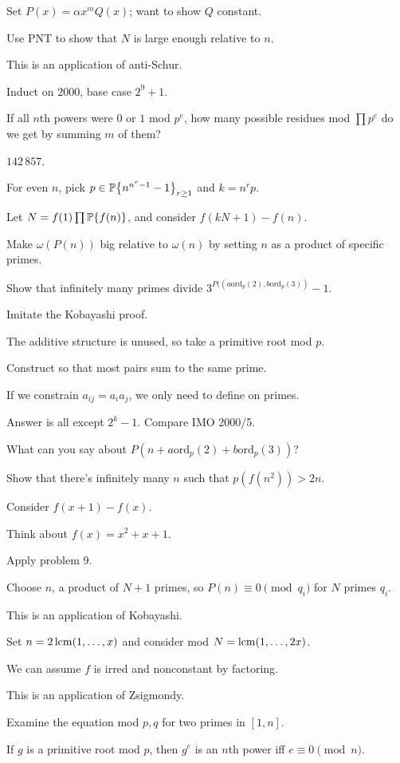 \documentclass[11pt,paper=letter]{scrartcl}
\newcommand{\seq}[1]{\left\{#1\right\}}
\newcommand{\primeseq}[1]{\PP\!\seq{#1}}
\begin{document}
\begin{enumthin}
\item \label{h:18a} Set $P(x) = \alpha x^m Q(x)$; want to show $Q$ constant.
\item \label{h:19c} Use PNT to show that $N$ is large enough relative to $n$.
\item \label{h:1} This is an application of anti-Schur.
\item \label{h:7} Induct on $2000$, base case $2^9 + 1$.
\item \label{h:19a} If all $n$th powers were $0$ or $1$ mod $p^e$, how many possible residues mod $\prod p^e$ do we get by summing $m$ of them?
\item \label{h:13} $142\,857$.
\item \label{h:10} For even $n$, pick $p \in \primeseq{n^{n^r - 1} - 1}_{r \ge 1}$ and $k = n^rp$.
\item \label{h:8} Let $N = f(1) \prod \primeseq{f(n)}$, and consider $f(kN + 1) - f(n)$.
\item \label{h:18b} Make $\omega(P(n))$ big relative to $\omega(n)$ by setting $n$ as a product of specific primes.
\item \label{h:16b} Show that infinitely many primes divide $3^{P((a \mathrm{ord}_p(2), b \mathrm{ord}_p(3))} - 1$.
\item \label{h:5} Imitate the Kobayashi proof.
\item \label{h:14a} The additive structure is unused, so take a primitive root mod $p$.
\item \label{h:3} Construct so that most pairs sum to the same prime.
\item \label{h:17a} If we constrain $a_{ij} = a_ia_j$, we only need to define on primes.
\item \label{h:11} Answer is all except $2^k - 1$. Compare IMO 2000/5.
\item \label{h:16a} What can you say about $P(n + a\mathrm{ord}_p(2) + b\mathrm{ord}_p(3))$?
\item \label{h:15b} Show that there's infinitely many $n$ such that $p(f(n^2)) > 2n$.
\item \label{h:9} Consider $f(x + 1) - f(x)$.
\item \label{h:4} Think about $f(x) = x^2 + x + 1$.
\item \label{h:12} Apply problem 9.
\item \label{h:18c} Choose $n$, a product of $N+1$ primes, so $P(n) \equiv 0 \pmod{q_i}$ for $N$ primes $q_i$.
\item \label{h:6} This is an application of Kobayashi.
\item \label{h:19b} Set $n = 2\operatorname*{lcm}(1, \ldots, x)$ and consider mod $N = \operatorname*{lcm}(1, \ldots, 2x)$.
\item \label{h:15a} We can assume $f$ is irred and nonconstant by factoring.
\item \label{h:2} This is an application of Zsigmondy.
\item \label{h:17b} Examine the equation mod $p, q$ for two primes in $[1, n]$.
\item \label{h:14b} If $g$ is a primitive root mod $p$, then $g^e$ is an $n$th power iff $e \equiv 0 \pmod n$.
\end{enumthin}
\end{document}
